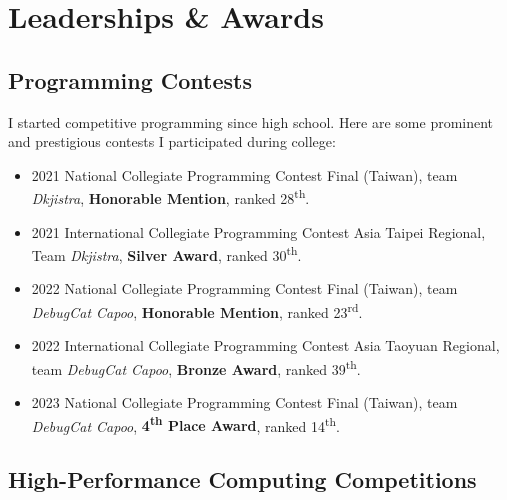 \documentclass[12pt, a4paper]{article}
\begin{document}
\section{Leaderships \& Awards}

\subsection{Programming Contests}


I started competitive programming since high school. Here are some prominent and prestigious contests I participated during college:

\begin{itemize}
\item 2021 National Collegiate Programming Contest Final (Taiwan), team \emph{Dkjistra}, \textbf{Honorable Mention}, ranked 28\textsuperscript{th}.
\item 2021 International Collegiate Programming Contest Asia Taipei Regional, Team \emph{Dkjistra}, \textbf{Silver Award}, ranked 30\textsuperscript{th}.
\item 2022 National Collegiate Programming Contest Final (Taiwan), team \emph{DebugCat Capoo}, \textbf{Honorable Mention}, ranked 23\textsuperscript{rd}.
\item 2022 International Collegiate Programming Contest Asia Taoyuan Regional, team \emph{DebugCat Capoo}, \textbf{Bronze Award}, ranked 39\textsuperscript{th}.
\item 2023 National Collegiate Programming Contest Final (Taiwan), team \emph{DebugCat Capoo}, \textbf{4\textsuperscript{th} Place Award}, ranked 14\textsuperscript{th}.
\end{itemize}

\subsection{High-Performance Computing Competitions}
\end{document}
